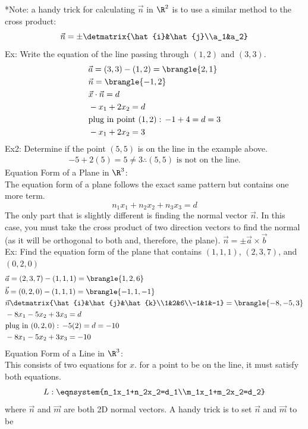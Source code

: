 *Note: a handy trick for calculating $\vec{n}$ in $\R^2$ is to use a similar method to the cross product:
$$\vec{n}=\pm\detmatrix{\hat{i}&\hat{j}\\a_1&a_2}$$
Ex: Write the equation of the line passing through $(1,2)$ and $(3,3)$.
\begin{align*}
    &\vec{a}=(3,3)-(1,2)=\brangle{2,1}\\
    &\vec{n}=\brangle{-1,2}\\
    &\vec{x}\cdot\vec{n}=d\\
    &-x_1+2x_2=d\\
    &\text{plug in point }(1,2):\,-1+4=d=3\\
    &-x_1+2x_2=3
\end{align*}
Ex2: Determine if the point $(5,5)$ is on the line in the example above.
\begin{align*}
    -5+2(5)=5\neq3\therefore(5,5)\text{ is not on the line.}
\end{align*}
Equation Form of a Plane in $\R^3$:\\
The equation form of a plane follows the exact same pattern but contains one more term.
$$n_1x_1+n_2x_2+n_3x_3=d$$
The only part that is slightly different is finding the normal vector $\vec{n}$. In this case, you must take the cross product of two direction vectors to find the normal (as it will be orthogonal to both and, therefore, the plane). $\vec{n}=\pm\vec{a}\times\vec{b}$\\
Ex: Find the equation form of the plane that contains $(1,1,1)$, $(2,3,7)$, and $(0,2,0)$
\begin{align*}
    &\vec{a}=(2,3,7)-(1,1,1)=\brangle{1,2,6}\\
    &\vec{b}=(0,2,0)-(1,1,1)=\brangle{-1,1,-1}\\
    &\vec{n}\detmatrix{\hat{i}&\hat{j}&\hat{k}\\1&2&6\\-1&1&-1}=\brangle{-8,-5,3}\\
    &-8x_1-5x_2+3x_3=d\\
    &\text{plug in }(0,2,0):\,-5(2)=d=-10\\
    &-8x_1-5x_2+3x_3=-10
\end{align*}
Equation Form of a Line in $\R^3$:\\
This consists of two equations for $x$. for a point to be on the line, it must satisfy both equations.
$$L:\eqnsystem{n_1x_1+n_2x_2=d_1\\m_1x_1+m_2x_2=d_2}$$
where $\vec{n}$ and $\vec{m}$ are both 2D normal vectors. A handy trick is to set $\vec{n}$ and $\vec{m}$ to be
